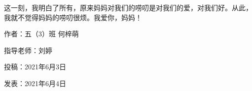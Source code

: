 这一刻，我明白了所有，原来妈妈对我们的唠叨是对我们的爱，对我们好。从此，我就不觉得妈妈的唠叨很烦。我爱你，妈妈！





\vspace{10pt}



作者：五（3）班 何梓萌



指导老师：刘婷



投稿：2021年6月3日





发表：2021年6月4日






                



\vspace{10pt}

\hline



